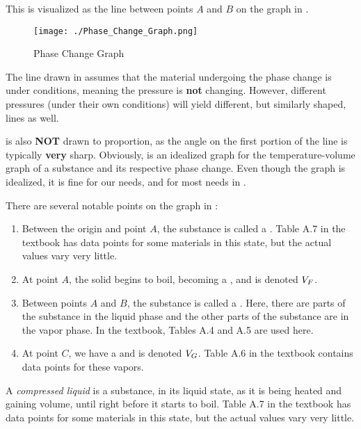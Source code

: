 This is visualized as the line between points $A$ and $B$ on the graph in .

\begin{figure}[h!tbp]
  \centering
  \texttt{[image: ./Phase\_Change\_Graph.png]}
  \caption{Phase Change Graph}
  \label{fig:Phase_Change}
\end{figure}

The line drawn in  assumes that the material undergoing the phase change is under  conditions, meaning the pressure is \textbf{not} changing.
However, different pressures (under their own  conditions) will yield different, but similarly shaped, lines as well.

\begin{remark*}
   is also \textbf{NOT} drawn to proportion, as the angle on the first portion of the line is typically \textbf{very} sharp.
  Obviously,  is an idealized graph for the temperature-volume graph of a substance and its respective phase change.
  Even though the graph is idealized, it is fine for our needs, and for most needs in .
\end{remark*}

There are several notable points on the graph in :
\begin{enumerate}[noitemsep]
\item Between the origin and point $A$, the substance is called a .
  Table A.7 in the textbook has data points for some materials in this state, but the actual values vary very little.
\item At point $A$, the solid begins to boil, becoming a , and is denoted $V_{F}$.
\item Between points $A$ and $B$, the substance is called a .
  Here, there are parts of the substance in the liquid phase and the other parts of the substance are in the vapor phase.
  In the textbook, Tables A.4 and A.5 are used here.
\item At point $C$, we have a  and is denoted $V_{G}$.
  Table A.6 in the textbook contains data points for these vapors.
\end{enumerate}

\begin{definition}\label{def:Compressed_Liquid}
  A \emph{compressed liquid} is a substance, in its liquid state, as it is being heated and gaining volume, until right before it starts to boil.
  Table A.7 in the textbook has data points for some materials in this state, but the actual values vary very little.
\end{definition}

